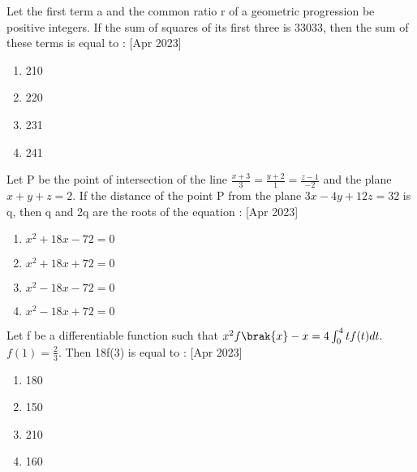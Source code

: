     \item Let the first term a and the common ratio r of a geometric progression be positive integers. If the sum of squares of its first three is 33033, then the sum of these terms is equal to :
     \hfill{[Apr 2023]}
    \begin{multicols}{4}
            \begin{enumerate}
              \item 210
              \item 220
              \item 231
              \item 241
            \end{enumerate}
        \end{multicols}
    
    

    \item Let P  be the point of intersection of the line $\frac{x+3}{3}=\frac{y+2}{1}=\frac{z-1}{-2}$ and the plane  $x+y+z=2$. If the distance of the point P from the plane $3x-4y+12z=32$ is q, then q and 2q are the roots of the equation :
     \hfill{[Apr 2023]}
    \begin{multicols}{4}
            \begin{enumerate}
              \item $x^2+18x-72=0$
              \item $x^2+18x+72=0$
              \item $x^2-18x-72=0$
              \item $x^2-18x+72=0$
            \end{enumerate}
        \end{multicols}
    \item Let f be a differentiable function such that $x^2f\brak{x}-x=4\int_{0}^{4} tf(t)dt.$ $f(1)=\frac{2}{3}$. Then 18f(3) is  equal to :
     \hfill{[Apr 2023]}
    \begin{multicols}{4}
            \begin{enumerate}
              \item 180
              \item 150
              \item 210
              \item 160
            \end{enumerate}
        \end{multicols}
    
